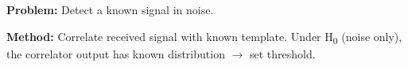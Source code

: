 \begin{Shaded}
\begin{Highlighting}[]
\OperatorTok{;}
\NormalTok{(}\OperatorTok{,}\OperatorTok{,}\NormalTok{)}\OperatorTok{;} \NormalTok{(}\OperatorTok{,} \OperatorTok{,} \OperatorTok{,} \NormalTok{)}\OperatorTok{;}
 \OperatorTok{;}  \OperatorTok{=} \NormalTok{(}\OperatorTok{{-}}\OperatorTok{,}\OperatorTok{,}\NormalTok{)}\OperatorTok{;} \NormalTok{(}\OperatorTok{,} \NormalTok{(}\OperatorTok{,}\OperatorTok{,}\NormalTok{)}\OperatorTok{,}\OperatorTok{,}\OperatorTok{,}\NormalTok{)}\OperatorTok{;}
\NormalTok{(}\NormalTok{)}\OperatorTok{;}
\NormalTok{(}\OperatorTok{,}\OperatorTok{,}\NormalTok{)}\OperatorTok{;} \NormalTok{(}\NormalTok{)}\OperatorTok{;} \NormalTok{(}\NormalTok{)}\OperatorTok{;}
\end{Highlighting}
\end{Shaded}


\textbf{Problem:} Detect a known signal in noise.

\textbf{Method:} Correlate received signal with known template. Under H\textsubscript{0} (noise only), the correlator output has known distribution \ensuremath{\to} set threshold.


